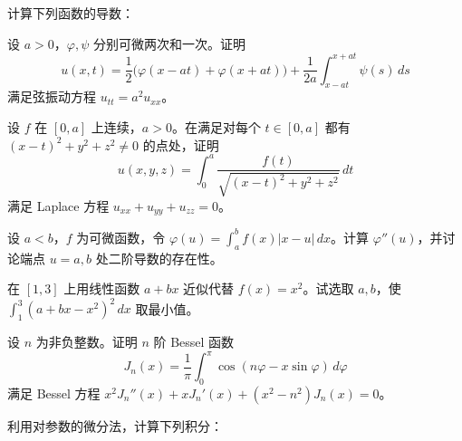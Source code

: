 \noindent\begin{minipage}{\textwidth}
计算下列函数的导数：
\end{minipage}\par\vfill
\noindent\begin{minipage}{\textwidth}
设 $a>0$，$\varphi,\psi$ 分别可微两次和一次。证明\[u(x,t)=\frac12\bigl(\varphi(x-at)+\varphi(x+at)\bigr)+\frac1{2a}\int_{x-at}^{x+at}\psi(s)\,ds\]满足弦振动方程 $u_{tt}=a^2u_{xx}$。
\end{minipage}\par\vfill
\newpage
\noindent\begin{minipage}{\textwidth}
设 $f$ 在 $[0,a]$ 上连续，$a>0$。在满足对每个 $t\in[0,a]$ 都有 $(x-t)^2+y^2+z^2\ne0$ 的点处，证明\[u(x,y,z)=\int_0^a\frac{f(t)}{\sqrt{(x-t)^2+y^2+z^2}}\,dt\]满足 Laplace 方程 $u_{xx}+u_{yy}+u_{zz}=0$。
\end{minipage}\par\vfill
\noindent\begin{minipage}{\textwidth}
设 $a<b$，$f$ 为可微函数，令 $\displaystyle\varphi(u)=\int_a^bf(x)|x-u|\,dx$。计算 $\varphi''(u)$，并讨论端点 $u=a,b$ 处二阶导数的存在性。
\end{minipage}\par\vfill
\noindent\begin{minipage}{\textwidth}
在 $[1,3]$ 上用线性函数 $a+bx$ 近似代替 $f(x)=x^2$。试选取 $a,b$，使 $\displaystyle\int_1^3(a+bx-x^2)^2\,dx$ 取最小值。
\end{minipage}\par\vfill
\newpage
\noindent\begin{minipage}{\textwidth}
设 $n$ 为非负整数。证明 $n$ 阶 Bessel 函数\[J_n(x)=\frac1\pi\int_0^\pi\cos(n\varphi-x\sin\varphi)\,d\varphi\]满足 Bessel 方程 $x^2J_n''(x)+xJ_n'(x)+(x^2-n^2)J_n(x)=0$。
\end{minipage}\par\vfill
\noindent\begin{minipage}{\textwidth}
利用对参数的微分法，计算下列积分：
\end{minipage}\par\vfill
